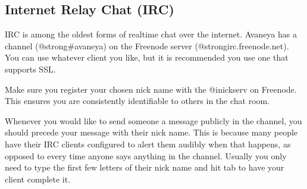 \subsection{Internet Relay Chat (IRC)}

IRC is among the oldest forms of realtime chat over the internet. Avaneya has a channel (@strong{#avaneya}) on the Freenode server (@strong{irc.freenode.net}). You can use whatever client you like, but it is recommended you use one that supports SSL.

Make sure you register your chosen nick name with the @i{nickserv} on Freenode. This ensures you are consistently identifiable to others in the chat room.

Whenever you would like to send someone a message publicly in the channel, you should precede your message with their nick name. This is because many people have their IRC clients configured to alert them audibly when that happens, as opposed to every time anyone says anything in the channel. Usually you only need to type the first few letters of their nick name and hit tab to have your client complete it.


